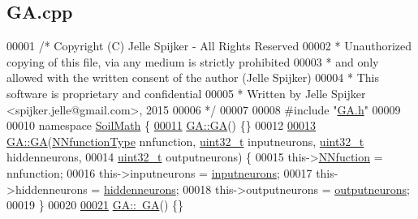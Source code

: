 \hypertarget{_g_a_8cpp_source}{}\subsection{G\+A.\+cpp}
\label{_g_a_8cpp_source}

\begin{DoxyCode}
00001 \textcolor{comment}{/* Copyright (C) Jelle Spijker - All Rights Reserved}
00002 \textcolor{comment}{ * Unauthorized copying of this file, via any medium is strictly prohibited}
00003 \textcolor{comment}{ * and only allowed with the written consent of the author (Jelle Spijker)}
00004 \textcolor{comment}{ * This software is proprietary and confidential}
00005 \textcolor{comment}{ * Written by Jelle Spijker <spijker.jelle@gmail.com>, 2015}
00006 \textcolor{comment}{ */}
00007 
00008 \textcolor{preprocessor}{#include "\hyperlink{_g_a_8h}{GA.h}"}
00009 
00010 \textcolor{keyword}{namespace }\hyperlink{namespace_soil_math}{SoilMath} \{
\hypertarget{_g_a_8cpp_source_l00011}{}\hyperlink{class_soil_math_1_1_g_a_a759b77fbe44fa1d5df5bcbdee9d97c4e}{00011} \hyperlink{class_soil_math_1_1_g_a_a759b77fbe44fa1d5df5bcbdee9d97c4e}{GA::GA}() \{\}
00012 
\hypertarget{_g_a_8cpp_source_l00013}{}\hyperlink{class_soil_math_1_1_g_a_a6fed498b99290a5218cc3ecd9537fc74}{00013} \hyperlink{class_soil_math_1_1_g_a_a759b77fbe44fa1d5df5bcbdee9d97c4e}{GA::GA}(\hyperlink{_soil_math_types_8h_a7791f1b8f92a964847637c5d657c1b10}{NNfunctionType} nnfunction, \hyperlink{_soil_math_types_8h_a435d1572bf3f880d55459d9805097f62}{uint32\_t} inputneurons, 
      \hyperlink{_soil_math_types_8h_a435d1572bf3f880d55459d9805097f62}{uint32\_t} hiddenneurons,
00014        \hyperlink{_soil_math_types_8h_a435d1572bf3f880d55459d9805097f62}{uint32\_t} outputneurons) \{
00015   this->\hyperlink{class_soil_math_1_1_g_a_a9b690048c89c32e3153457378b5e1c31}{NNfuction} = nnfunction;
00016   this->inputneurons = \hyperlink{class_soil_math_1_1_g_a_ac32591e30dde5ac854ae57a7b9e33298}{inputneurons};
00017   this->hiddenneurons = \hyperlink{class_soil_math_1_1_g_a_a3f1eee7492f68a05b9b06ee8afb2ec20}{hiddenneurons};
00018   this->outputneurons = \hyperlink{class_soil_math_1_1_g_a_ab454f9968d5ce2a294b89f85c9d3a74f}{outputneurons};
00019 \}
00020 
\hypertarget{_g_a_8cpp_source_l00021}{}\hyperlink{class_soil_math_1_1_g_a_a7a7087b2c5a268a1a9bccc04600537f6}{00021} \hyperlink{class_soil_math_1_1_g_a_a7a7087b2c5a268a1a9bccc04600537f6}{GA::~GA}() \{\}

\end{DoxyCode}
